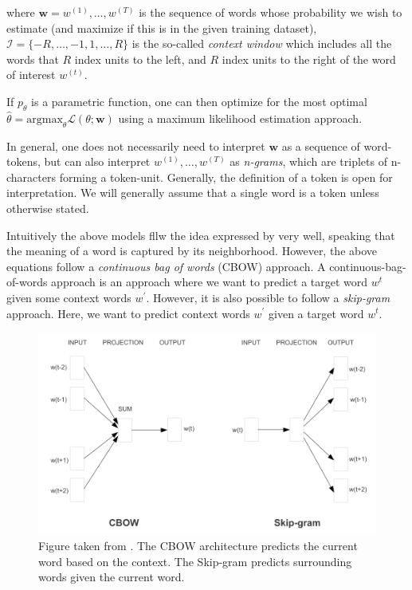 \documentclass[a4paper,12pt,twoside,openright]{report}
\begin{document}
where $\mathbf{w} = w^{(1)}, \dots, w^{(T)} $ is the sequence of words whose probability we wish to estimate (and maximize if this is in the given training dataset), $\mathcal{I}=\{-R, \ldots,-1,1, \ldots, R\}$ is the so-called \textit{context window} which includes all the words that $R$ index units to the left, and $R$ index units to the right of the word of interest $w^(t)$.


If $p_\theta$ is a parametric function, one can then optimize for the most optimal $\hat{\theta} = \text{argmax}_\theta \mathcal{L}(\theta ; \mathbf{w})$ using a maximum likelihood estimation approach.

In general, one does not necessarily need to interpret $\mathbf{w}$ as a sequence of word-tokens, but can also interpret $w^{(1)}, \ldots, w^{(T)}$ as \textit{n-grams}, which are triplets of n-characters forming a token-unit.
Generally, the definition of a token is open for interpretation. 
We will generally assume that a single word is a token unless otherwise stated.

Intuitively the above models fllw the idea expressed by \cite{harris54} very well, speaking that the meaning of a word is captured by its neighborhood.
However, the above equations follow a \textit{continuous bag of words } (CBOW) approach.
A continuous-bag-of-words approach is an approach where we want to predict a target word $w^t$ given some context words $w^{\prime}$.
However, it is also possible to follow a \textit{skip-gram} approach.
Here, we want to predict context words $w^{\prime}$ given a target word $w^t$.

\begin{figure}[h]
	\center
  \includegraphics[width=0.6\linewidth]{./assets/background/cbow_and_skipgram.png}
  \caption{Figure taken from \cite{mikolov13}. The CBOW architecture predicts the current word based on the context. The Skip-gram predicts surrounding words given the current word.}
  \label{fig:cbow_skipgram}
\end{figure}
\end{document}

